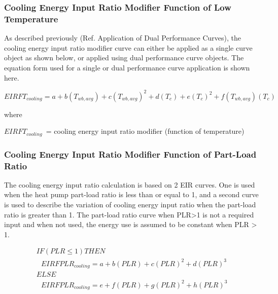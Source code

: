 \subsubsection{Cooling Energy Input Ratio Modifier Function of Low Temperature}\label{cooling-energy-input-ratio-modifier-function-of-low-temperature}

As described previously (Ref. Application of Dual Performance Curves), the cooling energy input ratio modifier curve can either be applied as a single curve object as shown below, or applied using dual performance curve objects. The equation form used for a single or dual performance curve application is shown here.

\begin{equation}
  EIRFT_{cooling} = a + b \left( T_{wb,avg} \right) + c \left( T_{wb,avg} \right)^2 + d \left( T_c \right) + e \left( T_c \right)^2 + f \left( T_{wb,avg} \right) \left( T_c \right)
\end{equation}

where

\(EIRFT_{cooling}\) = cooling energy input ratio modifier (function of temperature)

\subsubsection{Cooling Energy Input Ratio Modifier Function of Part-Load Ratio}\label{cooling-energy-input-ratio-modifier-function-of-part-load-ratio}

The cooling energy input ratio calculation is based on 2 EIR curves. One is used when the heat pump part-load ratio is less than or equal to 1, and a second curve is used to describe the variation of cooling energy input ratio when the part-load ratio is greater than 1. The part-load ratio curve when PLR>1 is not a required input and when not used, the energy use is assumed to be constant when PLR > 1.

\begin{equation}
  \begin{array}{l}
  IF\left( {PLR \le 1} \right)THEN \\
  \,\,\,\,EIRFPLR_{cooling} = a + b \left( PLR \right) + c \left( PLR \right)^2 + d \left( PLR \right)^3 \\
  ELSE \\
  \,\,\,\,EIRFPLR_{cooling} = e + f \left( PLR \right) + g \left( PLR \right)^2 + h \left( PLR \right)^3
  \end{array}
\end{equation}

